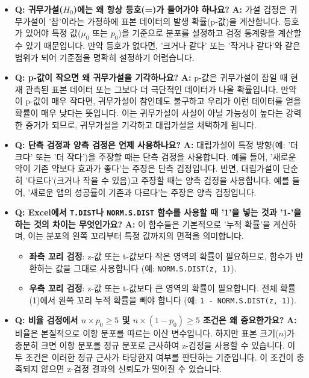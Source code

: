 \documentclass[11pt,a4paper]{book}
\theoremstyle{definition}
\begin{document}
\begin{itemize}
    \item \textbf{Q: 귀무가설($H_0$)에는 왜 항상 등호(=)가 들어가야 하나요?}
    \textbf{A:} 가설 검정은 귀무가설이 '참'이라는 가정하에 표본 데이터의 발생 확률(p-값)을 계산합니다. 등호가 있어야 특정 값($\mu_0$ 또는 $p_0$)을 기준으로 분포를 설정하고 검정 통계량을 계산할 수 있기 때문입니다. 만약 등호가 없다면, '크거나 같다' 또는 '작거나 같다'와 같은 범위가 되어 기준점을 명확히 설정하기 어렵습니다.

    \item \textbf{Q: p-값이 작으면 왜 귀무가설을 기각하나요?}
    \textbf{A:} p-값은 귀무가설이 참일 때 현재 관측된 표본 데이터 또는 그보다 더 극단적인 데이터가 나올 확률입니다. 만약 이 p-값이 매우 작다면, 귀무가설이 참인데도 불구하고 우리가 이런 데이터를 얻을 확률이 매우 낮다는 뜻입니다. 이는 귀무가설이 사실이 아닐 가능성이 높다는 강력한 증거가 되므로, 귀무가설을 기각하고 대립가설을 채택하게 됩니다.

    \item \textbf{Q: 단측 검정과 양측 검정은 언제 사용하나요?}
    \textbf{A:} 대립가설이 특정 방향(예: '더 크다' 또는 '더 작다')을 주장할 때는 단측 검정을 사용합니다. 예를 들어, '새로운 약이 기존 약보다 효과가 좋다'는 주장은 단측 검정입니다. 반면, 대립가설이 단순히 '다르다'(크거나 작을 수 있음)고 주장할 때는 양측 검정을 사용합니다. 예를 들어, '새로운 앱의 성공률이 기존과 다르다'는 주장은 양측 검정입니다.

    \item \textbf{Q: Excel에서 \texttt{T.DIST}나 \texttt{NORM.S.DIST} 함수를 사용할 때 '1'을 넣는 것과 '1-'을 하는 것의 차이는 무엇인가요?}
    \textbf{A:} 이 함수들은 기본적으로 '누적 확률'을 계산하며, 이는 분포의 왼쪽 꼬리부터 특정 값까지의 면적을 의미합니다.
    \begin{itemize}
        \item \textbf{좌측 꼬리 검정}: z-값 또는 t-값보다 작은 영역의 확률이 필요하므로, 함수가 반환하는 값을 그대로 사용합니다 (예: \texttt{NORM.S.DIST(z, 1)}).
        \item \textbf{우측 꼬리 검정}: z-값 또는 t-값보다 큰 영역의 확률이 필요합니다. 전체 확률(1)에서 왼쪽 꼬리 누적 확률을 빼야 합니다 (예: \texttt{1 - NORM.S.DIST(z, 1)}).
    \end{itemize}

    \item \textbf{Q: 비율 검정에서 $n \times p_0 \ge 5$ 및 $n \times (1 - p_0) \ge 5$ 조건은 왜 중요한가요?}
    \textbf{A:} 비율은 본질적으로 이항 분포를 따르는 이산 변수입니다. 하지만 표본 크기($n$)가 충분히 크면 이항 분포를 정규 분포로 근사하여 z-검정을 사용할 수 있습니다. 이 두 조건은 이러한 정규 근사가 타당한지 여부를 판단하는 기준입니다. 이 조건이 충족되지 않으면 z-검정 결과의 신뢰도가 떨어질 수 있습니다.
\end{itemize}
\end{document}
